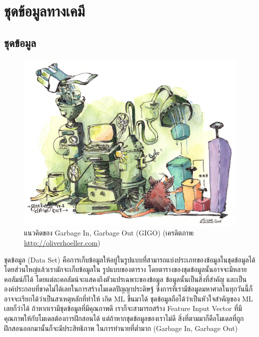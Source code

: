 

\chapter{ชุดข้อมูลทางเคมี}
\label{ch:chem_dataset}

\section{ชุดข้อมูล}
\label{sec:dataset}

\begin{figure}[htbp]
    \centering
    \includegraphics[width=0.8\linewidth]{fig/gigo.png}
    \caption{แนวคิดของ Garbage In, Garbage Out (GIGO) (เครดิตภาพ: \url{http://oliverhoeller.com})}
    \label{fig:gigo}
\end{figure}

ชุดข้อมูล (Data Set) คือการเก็บข้อมูลให้อยู่ในรูปแบบที่สามารถแบ่งประเภทของข้อมูลในชุดข้อมูลได้ โดยส่วนใหญ่แล้วเรามักจะเก็บข้อมูลใน%
รูปแบบของตาราง โดยตารางของชุดข้อมูลนั้นอาจจะมีหลายคอลัมน์ก็ได้ โดยแต่ละคอลัมน์จะแสดงถึงตัวแปรเฉพาะของข้อมูล ข้อมูลนั้นเป็นสิ่งที่สำคัญ%
และเป็นองค์ประกอบที่ขาดไม่ได้เลยในการสร้างโมเดลปัญญาประดิษฐ์ ซึ่งการที่เรามีข้อมูลมหาศาลในทุกวันนี้ก็อาจจะเรียกได้ว่าเป็นสาเหตุหลักที่ทำให้%
เกิด ML ขึ้นมาได้ ชุดข้อมูลถือได้ว่าเป็นหัวใจสำคัญของ ML เลยก็ว่าได้ ถ้าหากเรามีชุดข้อมูลที่มีคุณภาพดี เราก็จะสามารถสร้าง Feature Input 
Vector ที่มีคุณภาพให้กับโมเดลต้องการฝึกสอนได้ แต่ถ้าหากชุดข้อมูลของเราไม่ดี สิ่งที่ตามมาก็คือโมเดลที่ถูกฝึกสอนออกมานั้นก็จะมีประสิทธิภาพ%
ในการทำนายที่ต่ำมาก (Garbage In, Garbage Out) 

